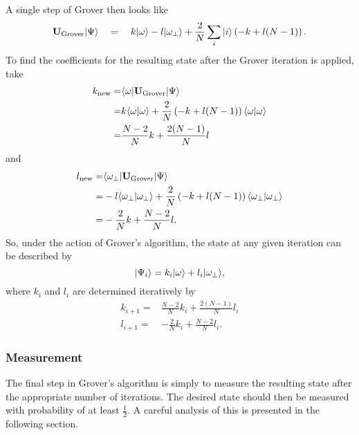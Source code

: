 A single step of Grover then looks like
\begin{equation}
{\bf U}_{\text{Grover}}{|{\Psi}\rangle}
\quad =\quad 
                k{|{\omega}\rangle} - l{|{\omega_\perp}\rangle}
                + \frac{2}{N} \sum_i {|{i}\rangle} \left(
                                    - k + l(N-1)
                              \right).
\end{equation}
To find the coefficients for the resulting state after 
the Grover iteration is applied, take
\begin{equation}
\begin{split}
k_{\text{new}} =& {\langle{\omega}|}{\bf U}_{\text{Grover}}{|{\Psi}\rangle}\\
=& k{\langle{\omega}|{\omega}\rangle} + \frac{2}{N} \left( -k + l(N-1) \right)
{\langle{\omega}|{\omega}\rangle}\\
=& \frac{N-2}{N}k + \frac{2(N-1)}{N}l
\end{split}
\end{equation}
and 
\begin{equation}
\begin{split}
l_{\text{new}} =& {\langle{\omega_\perp}|}{\bf U}_{\text{Grover}}{|{\Psi}\rangle}\\
=& -l{\langle{\omega_\perp}|{\omega_\perp}\rangle}
+ \frac{2}{N} \left( -k + l(N-1) \right) {\langle{\omega_\perp}|{\omega_\perp}\rangle}\\
=& -\frac{2}{N}k + \frac{N-2}{N}l.
\end{split}
\end{equation}
So, under the action of Grover's algorithm, the state at any given
iteration can be described by
\begin{equation}
{|{\Psi_i}\rangle} = k_i{|{\omega}\rangle} + l_i{|{\omega_\perp}\rangle},
\end{equation}
where $k_i$ and $l_i$ are determined iteratively by
\begin{equation}
\begin{split}
k_{i+1} =& \frac{N-2}{N}k_i + \frac{2(N-1)}{N}l_i\\
l_{i+1} =& -\frac{2}{N}k_i + \frac{N-2}{N}l_i.
\end{split}
\end{equation}



                
\subsubsection{Measurement}

The final step in Grover's algorithm is simply to measure the
resulting state after the appropriate number of iterations.
The desired state should then be measured with probability of at
least $\frac{1}{2}$.
A careful analysis of this is presented in the following section.

